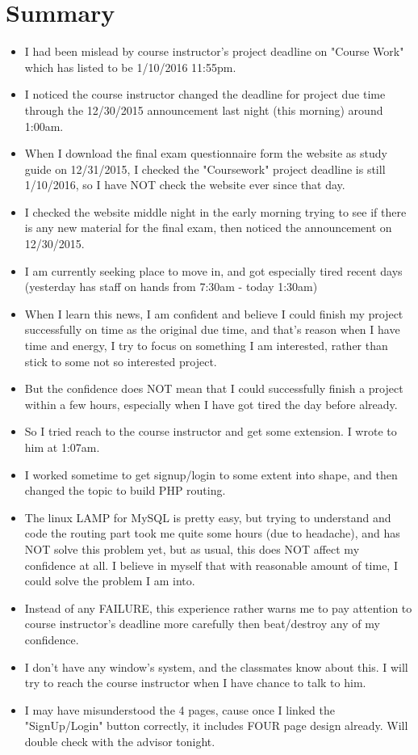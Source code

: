 \documentclass[9pt,b5paper]{article}
\begin{document}
\section{Summary}
\label{sec-3}
\begin{itemize}
\item I had been mislead by course instructor's project deadline on "Course Work" which has listed to be 1/10/2016 11:55pm.
\item I noticed the course instructor changed the deadline for project due time through the 12/30/2015 announcement last night (this morning) around 1:00am.
\item When I download the final exam questionnaire form the website as study guide on 12/31/2015, I checked the "Coursework" project deadline is still 1/10/2016, so I have NOT check the website ever since that day.
\item I checked the website middle night in the early morning trying to see if there is any new material for the final exam, then noticed the announcement on 12/30/2015.
\item I am currently seeking place to move in, and got especially tired recent days (yesterday has staff on hands from 7:30am - today 1:30am)
\item When I learn this news, I am confident and believe I could finish my project successfully on time as the original due time, and that's reason when I have time and energy, I try to focus on something I am interested, rather than stick to some not so interested project.
\item But the confidence does NOT mean that I could successfully finish a project within a few hours, especially when I have got tired the day before already.
\item So I tried reach to the course instructor and get some extension. I wrote to him at 1:07am.
\item I worked sometime to get signup/login to some extent into shape, and then changed the topic to build PHP routing.
\item The linux LAMP for MySQL is pretty easy, but trying to understand and code the routing part took me quite some hours (due to headache), and has NOT solve this problem yet, but as usual, this does NOT affect my confidence at all. I believe in myself that with reasonable amount of time, I could solve the problem I am into.
\item Instead of any FAILURE, this experience rather warns me to pay attention to course instructor's deadline more carefully then beat/destroy any of my confidence.
\item I don't have any window's system, and the classmates know about this. I will try to reach the course instructor when I have chance to talk to him.
\item I may have misunderstood the 4 pages, cause once I linked the "SignUp/Login" button correctly, it includes FOUR page design already. Will double check with the advisor tonight.
\end{itemize}
\end{document}
